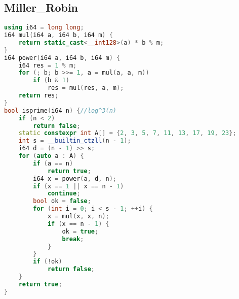 \subsection{Miller\_Robin}
\begin{lstlisting}[language=C++]
using i64 = long long;
i64 mul(i64 a, i64 b, i64 m) {
    return static_cast<__int128>(a) * b % m;
}
i64 power(i64 a, i64 b, i64 m) {
    i64 res = 1 % m;
    for (; b; b >>= 1, a = mul(a, a, m))
        if (b & 1)
            res = mul(res, a, m);
    return res;
}
bool isprime(i64 n) {//log^3(n)
    if (n < 2)
        return false;
    static constexpr int A[] = {2, 3, 5, 7, 11, 13, 17, 19, 23};
    int s = __builtin_ctzll(n - 1);
    i64 d = (n - 1) >> s;
    for (auto a : A) {
        if (a == n)
            return true;
        i64 x = power(a, d, n);
        if (x == 1 || x == n - 1)
            continue;
        bool ok = false;
        for (int i = 0; i < s - 1; ++i) {
            x = mul(x, x, n);
            if (x == n - 1) {
                ok = true;
                break;
            }
        }
        if (!ok)
            return false;
    }
    return true;
}
\end{lstlisting}
